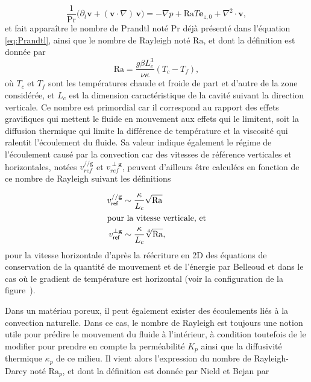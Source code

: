 \begin{equation}
	\frac{1}{\mathrm{Pr}}\big(\partial_t \mathbf{v} + (\mathbf{v} \cdot \nabla)\,\mathbf{v}\big) = -\nabla p + \mathrm{Ra} T \mathbf e_{z,0} + \nabla^2 \cdot \mathbf{v},
	\label{eq:NonDim_NavierStokes_Boussinesq_QtMvt}
\end{equation}
et fait apparaître le nombre de Prandtl noté $\mathrm{Pr}$ déjà présenté dans l'équation \eqref{eq:Prandtl}, ainsi que le nombre de Rayleigh noté $\mathrm{Ra}$, et dont la définition est donnée par 
\begin{equation}
	\mathrm{Ra} = \frac{g \beta L_c^3}{\nu \kappa} (T_c-T_f),
	\label{eq:NbrRayleigh}
\end{equation}
où $T_c$ et $T_f$ sont les températures chaude et froide de part et d'autre de la zone considérée, et $L_c$ est la dimension caractéristique de la cavité suivant la direction verticale. Ce nombre est primordial car il correspond au rapport des effets gravifiques qui mettent le fluide en mouvement aux effets qui le limitent, soit la diffusion thermique qui limite la différence de température et la viscosité qui ralentit l'écoulement du fluide. Sa valeur indique également le régime de l'écoulement causé par la convection car des vitesses de référence verticales et horizontales, notées $v_{ref}^{// \mathbf g}$ et $v_{ref}^{\perp \mathbf g}$, peuvent d'ailleurs être calculées en fonction de ce nombre de Rayleigh suivant les définitions

\begin{subequations}
	\begin{align}
		v_{\sf ref}^{// \mathbf g} &\sim \frac{\kappa}{L_c}\sqrt{\mathrm{Ra}} \label{eq:VitesseReferenceV_Rayleigh}\\
		\intertext{pour la vitesse verticale, et}
		v_{\sf ref}^{\perp \mathbf g} &\sim \frac{\kappa}{L_c}\sqrt[4]{\mathrm{Ra}},	\label{eq:VitesseReferenceH_Rayleigh}
	\end{align}
	\label{eq:VitesseReference_Rayleigh}%
\end{subequations}
pour la vitesse horizontale d'après la réécriture en 2D des équations de conservation de la quantité de mouvement et de l'énergie par Belleoud \cite{belleoud_etude_2016} et dans le cas où le gradient de température est horizontal (voir la configuration de la figure~).\medskip

Dans un matériau poreux, il peut également exister des écoulements liés à la convection naturelle. Dans ce cas, le nombre de Rayleigh est toujours une notion utile pour prédire le mouvement du fluide à l'intérieur, à condition toutefois de le modifier pour prendre en compte la perméabilité $K_p$ ainsi que la diffusivité thermique $\kappa_p$ de ce milieu. Il vient alors l'expression du nombre de Rayleigh-Darcy noté $\mathrm{Ra}_p$, et dont la définition est donnée par Nield et Bejan \cite{nield_convection_2013} par

